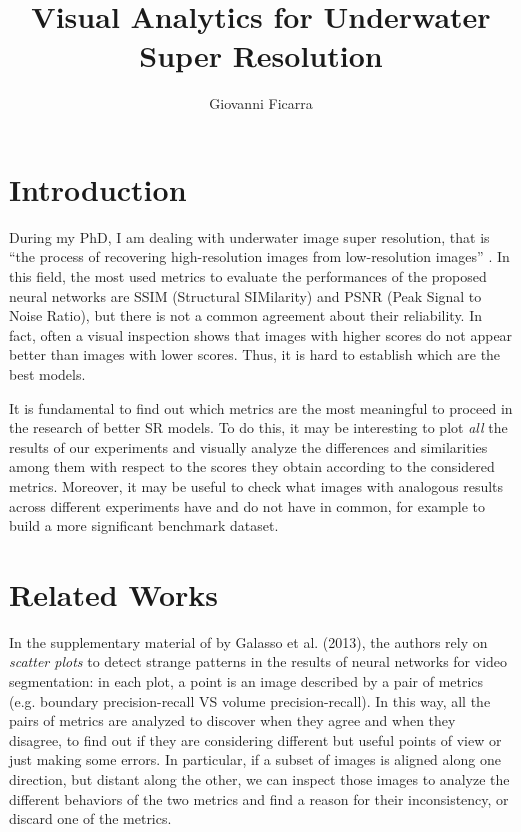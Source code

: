 \documentclass[12pt]{article}
\title{Visual Analytics for Underwater Super Resolution}
\author{Giovanni Ficarra}
\date{}
\begin{document}
	\maketitle

	\section{Introduction}\label{sec:intro}

	During my PhD, I am dealing with underwater image super resolution, that is ``the process of recovering high-resolution images from low-resolution images'' \cite{sr-survey}.
	In this field, the most used metrics to evaluate the performances of the proposed neural networks are SSIM (Structural SIMilarity) and PSNR (Peak Signal to Noise Ratio), but there is not a common agreement about their reliability. In fact, often a visual inspection shows that images with higher scores do not appear better than images with lower scores. Thus, it is hard to establish which are the best models.

	It is fundamental to find out which metrics are the most meaningful to proceed in the research of better SR models. To do this, it may be interesting to plot \textit{all} the results of our experiments and visually analyze the differences and similarities among them with respect to the scores they obtain according to the considered metrics.
	Moreover, it may be useful to check what images with analogous results across different experiments have and do not have in common, for example to build a more significant benchmark dataset.


	\section{Related Works}\label{sec:works}

	In the supplementary material \cite{galassounified} of \cite{galasso2013unified} by Galasso et al. (2013), the authors rely on \textit{scatter plots} to detect strange patterns in the results of neural networks for video segmentation: in each plot, a point is an image described by a pair of metrics (e.g. boundary precision-recall VS volume precision-recall). In this way, all the pairs of metrics are analyzed to discover when they agree and when they disagree, to find out if they are considering different but useful points of view or just making some errors.
	In particular, if a subset of images is aligned along one direction, but distant along the other, we can inspect those images to analyze the different behaviors of the two metrics and find a reason for their inconsistency, or discard one of the metrics.
\end{document}
